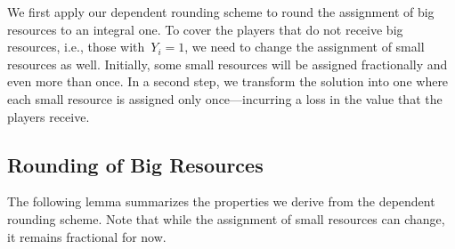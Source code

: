 \documentclass[a4paper,USenglish,cleveref,thm-restate]{lipics-v2021}
\begin{document}
We first apply our dependent rounding scheme to round
the assignment of big resources to an integral one.
To cover the players that do not receive big resources, i.e.,
those with~$Y_i = 1$, we need to change the assignment of
small resources as well.
Initially, some small resources will be assigned fractionally
and even more than once.
In a second step, we transform the solution into one
where each small resource is assigned only once---incurring a
loss in the value that the players receive.

\subsection{Rounding of Big Resources}
\label{sec:rounding-of-big-items}
The following lemma summarizes the properties we derive
from the dependent rounding scheme. 
Note that while the assignment of small resources can change, it remains fractional for now.
\end{document}
